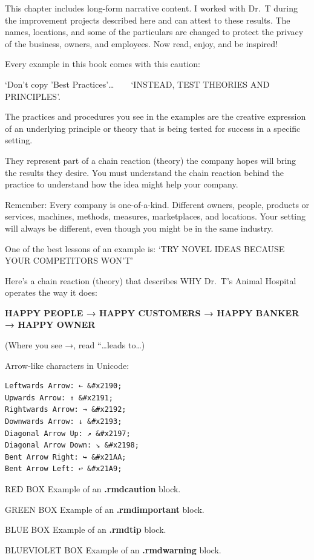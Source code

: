 \documentclass[
]{book}
\begin{document}
This chapter includes long-form narrative content. I worked with Dr.~T during the improvement projects described here and can attest to these results. The names, locations, and some of the particulars are changed to protect the privacy of the business, owners, and employees. Now read, enjoy, and be inspired!

Every example in this book comes with this caution:

{`Don't copy 'Best Practices'}\ldots{} ~ ~ {`INSTEAD, TEST THEORIES AND PRINCIPLES'}.

The practices and procedures you see in the examples are the creative expression of an underlying principle or theory that is being tested for success in a specific setting.

They represent part of a chain reaction (theory) the company hopes will bring the results they desire. You must understand the chain reaction behind the practice to understand how the idea might help your company.

Remember: Every company is one-of-a-kind. Different owners, people, products or services, machines, methods, measures, marketplaces, and locations. Your setting will always be different, even though you might be in the same industry.

One of the best lessons of an example is: {`TRY NOVEL IDEAS BECAUSE YOUR COMPETITORS WON'T'}

Here's a chain reaction (theory) that describes WHY Dr.~T's Animal Hospital operates the way it does:

\textbf{HAPPY PEOPLE {→} HAPPY CUSTOMERS {→} HAPPY BANKER {→} HAPPY OWNER}

(Where you see {→}, read ``\ldots leads to\ldots)

Arrow-like characters in Unicode:

\begin{verbatim}
Leftwards Arrow: ← &#x2190;
Upwards Arrow: ↑ &#x2191;
Rightwards Arrow: → &#x2192;
Downwards Arrow: ↓ &#x2193;
Diagonal Arrow Up: ↗ &#x2197;
Diagonal Arrow Down: ↘ &#x2198;
Bent Arrow Right: ↪ &#x21AA;
Bent Arrow Left: ↩ &#x21A9;
\end{verbatim}

RED BOX Example of an \textbf{.rmdcaution} block.

GREEN BOX Example of an \textbf{.rmdimportant} block.

BLUE BOX Example of an \textbf{.rmdtip} block.

BLUEVIOLET BOX Example of an \textbf{.rmdwarning} block.
\end{document}
